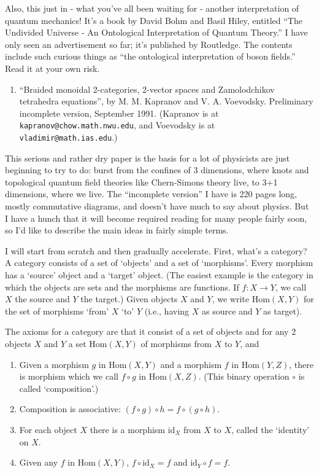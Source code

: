 \documentclass{article}
\def\tightlist{}
\begin{document}
Also, this just in - what you've all been waiting for - another
interpretation of quantum mechanics! It's a book by David Bohm and Basil
Hiley, entitled ``The Undivided Universe - An Ontological Interpretation
of Quantum Theory.'' I have only seen an advertisement so far; it's
published by Routledge. The contents include such curious things as
``the ontological interpretation of boson fields.'' Read it at your own
risk.

\begin{enumerate}
\def\labelenumi{\arabic{enumi})}
\setcounter{enumi}{2}
\tightlist
\item
  ``Braided monoidal 2-categories, 2-vector spaces and Zamolodchikov
  tetrahedra equations'', by M. M. Kapranov and V. A. Voevodsky.
  Preliminary incomplete version, September 1991. (Kapranov is at
  \texttt{kapranov@chow.math.nwu.edu}, and Voevodsky is at
  \texttt{vladimir@math.ias.edu}.)
\end{enumerate}

This serious and rather dry paper is the basis for a lot of physicists
are just beginning to try to do: burst from the confines of 3
dimensions, where knots and topological quantum field theories like
Chern-Simons theory live, to 3+1 dimensions, where we live. The
``incomplete version'' I have is 220 pages long, mostly commutative
diagrams, and doesn't have much to say about physics. But I have a hunch
that it will become required reading for many people fairly soon, so I'd
like to describe the main ideas in fairly simple terms.

I will start from scratch and then gradually accelerate. First, what's a
category? A category consists of a set of `objects' and a set of
`morphisms'. Every morphism has a `source' object and a `target' object.
(The easiest example is the category in which the objects are sets and
the morphisms are functions. If \(f\colon X\to Y\), we call \(X\) the
source and \(Y\) the target.) Given objects \(X\) and \(Y\), we write
\(\mathrm{Hom}(X,Y)\) for the set of morphisms `from' \(X\) `to' \(Y\)
(i.e., having \(X\) as source and \(Y\) as target).

The axioms for a category are that it consist of a set of objects and
for any 2 objects \(X\) and \(Y\) a set \(\mathrm{Hom}(X,Y)\) of
morphisms from \(X\) to \(Y\), and

\begin{enumerate}
\def\labelenumi{\alph{enumi})}
\item
  Given a morphism \(g\) in \(\mathrm{Hom}(X,Y)\) and a morphism \(f\)
  in \(\mathrm{Hom}(Y,Z)\), there is morphism which we call \(f\circ g\)
  in \(\mathrm{Hom}(X,Z)\). (This binary operation \(\circ\) is called
  `composition'.)
\item
  Composition is associative: \((f\circ g)\circ h = f\circ (g\circ h)\).
\item
  For each object \(X\) there is a morphism \(\mathrm{id}_X\) from \(X\)
  to \(X\), called the `identity' on \(X\).
\item
  Given any \(f\) in \(\mathrm{Hom}(X,Y)\),
  \(f \circ \mathrm{id}_X = f\) and \(\mathrm{id}_Y \circ f = f\).
\end{enumerate}
\end{document}
